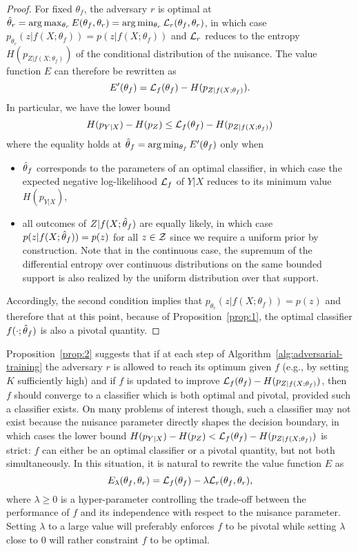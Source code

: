 \documentclass[twocolumn,superscriptaddress,aps]{revtex4-1}
\theoremstyle{plain}
\begin{document}
\begin{proof}

For fixed $\theta_f$, the adversary $r$ is optimal at $\hat\theta_r = \arg
\max_{\theta_r} E(\theta_f, \theta_r)  = \arg \min_{\theta_r} {\cal
L}_r(\theta_f, \theta_r)$, in which case $p_{\theta_r}(z|f(X;\theta_f)) =
p(z|f(X;\theta_f))$ and ${\cal L}_r$ reduces to the entropy
$H(p_{Z|f(X;\theta_f)})$ of the conditional distribution of the nuisance. The
value function $E$ can therefore be rewritten as $$E'(\theta_f) = {\cal
L}_f(\theta_f) - H(p_{Z|f(X;\theta_f)}).$$  In particular, we have the lower
bound $$H(p_{Y|X}) - H(p_Z) \leq {\cal L}_f(\theta_f) - H(p_{Z|f(X;\theta_f)})$$
where the equality holds at $\smash{\hat\theta}_f = \arg \min_{\theta_f}
E'(\theta_f)$ only when
\begin{itemize}
    \item $\smash{\hat\theta}_f$ corresponds to
    the parameters of an optimal classifier, in which case the expected
    negative log-likelihood ${\cal L}_f$ of $Y|X$ reduces to its minimum
    value $H(p_{Y|X})$,
    \item all
   outcomes of $Z|f(X;\smash{\hat\theta}_f)$ are equally likely, in which case
   $p(z|f(X;\smash{\hat\theta}_f)) = p(z)$ for all $z \in {\cal
   Z}$ since we require a uniform prior by construction. Note that in the
   continuous case, the supremum of the differential entropy
   over continuous distributions on the same bounded support is also realized
   by the uniform distribution over that support.
\end{itemize}
Accordingly, the second condition implies that $p_{\theta_r}(z|f(X;\theta_f)) =
p(z)$ and therefore that at this point, because of Proposition~\ref{prop:1}, the
optimal classifier $f(\cdot;\smash{\hat\theta}_f)$ is also a pivotal quantity.

\end{proof}

Proposition~\ref{prop:2} suggests that if at each step of
Algorithm~\ref{alg:adversarial-training} the adversary $r$ is allowed to reach
its optimum given $f$ (e.g., by setting $K$ sufficiently high) and if $f$ is
updated to improve ${\cal L}_f(\theta_f) - H(p_{Z|f(X;\theta_f)})$, then $f$
should converge to a classifier which is both optimal and pivotal, provided such
a classifier exists. On many problems of interest though, such a classifier may
not exist because the nuisance parameter directly shapes the decision boundary,
in which cases the lower bound $H(p_{Y|X}) - H(p_Z) < {\cal L}_f(\theta_f) -
H(p_{Z|f(X;\theta_f)})$ is strict: $f$ can either be an optimal classifier or a
pivotal quantity, but not both simultaneously. In this situation, it is natural
to rewrite the value function $E$  as
\begin{equation}
    E_\lambda(\theta_f, \theta_r) = {\cal L}_f(\theta_f) - \lambda {\cal L}_r(\theta_f, \theta_r),
\end{equation}
where $\lambda \geq 0$ is a hyper-parameter controlling the trade-off between
the performance of $f$ and its independence with respect to the nuisance
parameter. Setting $\lambda$ to a large value will preferably enforces $f$ to
be pivotal while setting $\lambda$ close to $0$ will rather constraint $f$ to be
optimal.
\end{document}
